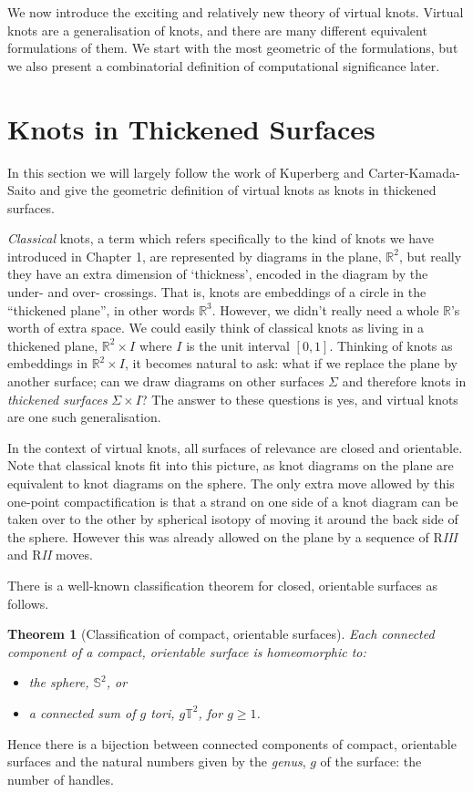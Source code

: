 \documentclass[12pt]{report}
\newcommand{\R}{\mathbb{R}}
\newcommand{\T}{\mathbb{T}}
\renewcommand{\S}{\mathbb{S}}
\newtheorem*{theorem}{Theorem}
\theoremstyle{upright}
\begin{document}
We now introduce the exciting and relatively new theory of virtual knots. Virtual knots are a generalisation of knots, and there are many different equivalent formulations of them. We start with the most geometric of the formulations, but we also present a combinatorial definition of computational significance later.


\section{Knots in Thickened Surfaces}

In this section we will largely follow the work of Kuperberg \cite{what-is-a-virtual-link} and Carter-Kamada-Saito \cite{stable-equivalence-virtual-cobordisms} and give the geometric definition of virtual knots as knots in thickened surfaces.

\textit{Classical} knots, a term which refers specifically to the kind of knots we have introduced in Chapter 1, are represented by diagrams in the plane, $\R^{2}$, but really they have an extra dimension of `thickness', encoded in the diagram by the under- and over- crossings. That is, knots are embeddings of a circle in the ``thickened plane'', in other words $\R^{3}$. However, we didn't really need a whole $\R$'s worth of extra space. We could easily think of classical knots as living in a thickened plane, $\R^{2} \times I$ where $I$ is the unit interval $[0, 1]$. Thinking of knots as embeddings in $\R^{2} \times I$, it becomes natural to ask: what if we replace the plane by another surface; can we draw diagrams on other surfaces $\Sigma$ and therefore knots in \textit{thickened surfaces} $\Sigma \times I$? The answer to these questions is yes, and virtual knots are one such generalisation.

In the context of virtual knots, all surfaces of relevance are closed and orientable. Note that classical knots fit into this picture, as knot diagrams on the plane are equivalent to knot diagrams on the sphere. The only extra move allowed by this one-point compactification is that a strand on one side of a knot diagram can be taken over to the other by spherical isotopy of moving it around the back side of the sphere. However this was already allowed on the plane by a sequence of R\textit{III} and R\textit{II} moves.

There is a well-known classification theorem for closed, orientable surfaces as follows.

\begin{theorem}[Classification of compact, orientable surfaces]
Each connected component of a compact, orientable surface is homeomorphic to:
\begin{itemize}
	\item the sphere, $\S^{2}$, or
	\item a connected sum of $g$ tori, $g\T^{2}$, for $g \geq 1$.
\end{itemize}
\end{theorem}
Hence there is a bijection between connected components of compact, orientable surfaces and the natural numbers given by the \textit{genus}, $g$ of the surface: the number of handles.
\end{document}
